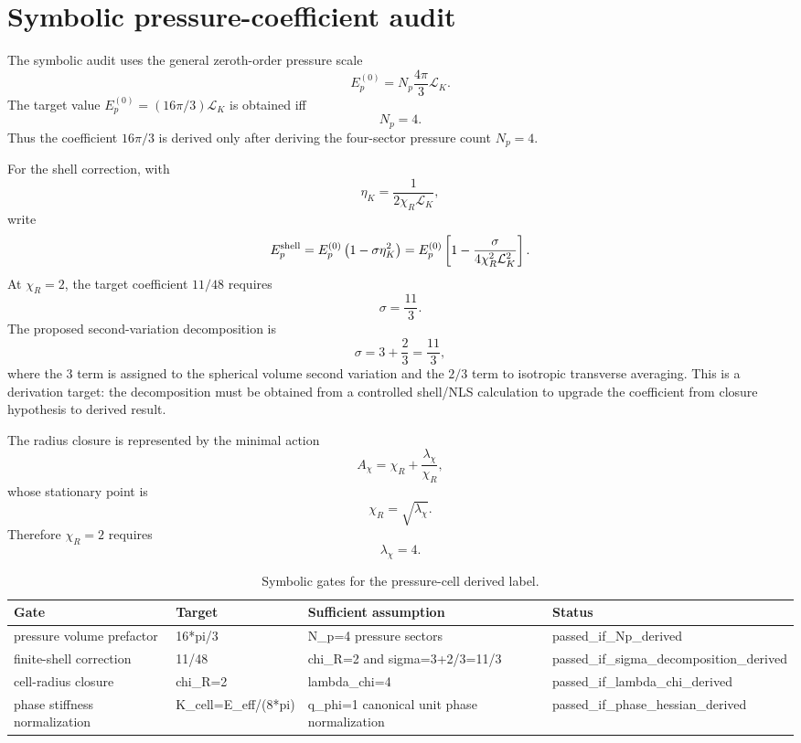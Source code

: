 \section{Symbolic pressure-coefficient audit}
\label{sec:symbolic-pressure-audit}

The symbolic audit uses the general zeroth-order pressure scale
\[
  E_p^{(0)} = N_p \frac{4\pi}{3}\mathcal L_K .
\]
The target value \(E_p^{(0)}=(16\pi/3)\mathcal L_K\) is obtained iff
\[
  N_p = 4.
\]
Thus the coefficient \(16\pi/3\) is derived only after deriving the
four-sector pressure count \(N_p=4\).

For the shell correction, with
\[
  \eta_K = \frac{1}{2\chi_R\mathcal L_K},
\]
write
\[
  E_p^{\rm shell}
  =
  E_p^{(0)}\left(1-\sigma\eta_K^2\right)
  =
  E_p^{(0)}\left[
  1-\frac{\sigma}{4\chi_R^2\mathcal L_K^2}
  \right].
\]
At \(\chi_R=2\), the target coefficient \(11/48\) requires
\[
  \sigma = \frac{11}{3}.
\]
The proposed second-variation decomposition is
\[
  \sigma = 3 + \frac{2}{3} = \frac{11}{3},
\]
where the \(3\) term is assigned to the spherical volume second variation and
the \(2/3\) term to isotropic transverse averaging.  This is a derivation target:
the decomposition must be obtained from a controlled shell/NLS calculation to
upgrade the coefficient from closure hypothesis to derived result.

The radius closure is represented by the minimal action
\[
  A_\chi=\chi_R+\frac{\lambda_\chi}{\chi_R},
\]
whose stationary point is
\[
  \chi_R=\sqrt{\lambda_\chi}.
\]
Therefore \(\chi_R=2\) requires
\[
  \lambda_\chi = 4.
\]

\begin{table}[h]
\centering
\caption{Symbolic gates for the pressure-cell derived label.}
\begin{tabular}{@{}llll@{}}
\toprule
Gate & Target & Sufficient assumption & Status\\
\midrule
pressure volume prefactor & 16*pi/3 & N_p=4 pressure sectors & passed_if_Np_derived \\
finite-shell correction & 11/48 & chi_R=2 and sigma=3+2/3=11/3 & passed_if_sigma_decomposition_derived \\
cell-radius closure & chi_R=2 & lambda_chi=4 & passed_if_lambda_chi_derived \\
phase stiffness normalization & K_cell=E_eff/(8*pi) & q_phi=1 canonical unit phase normalization & passed_if_phase_hessian_derived \\
\bottomrule
\end{tabular}
\end{table}
